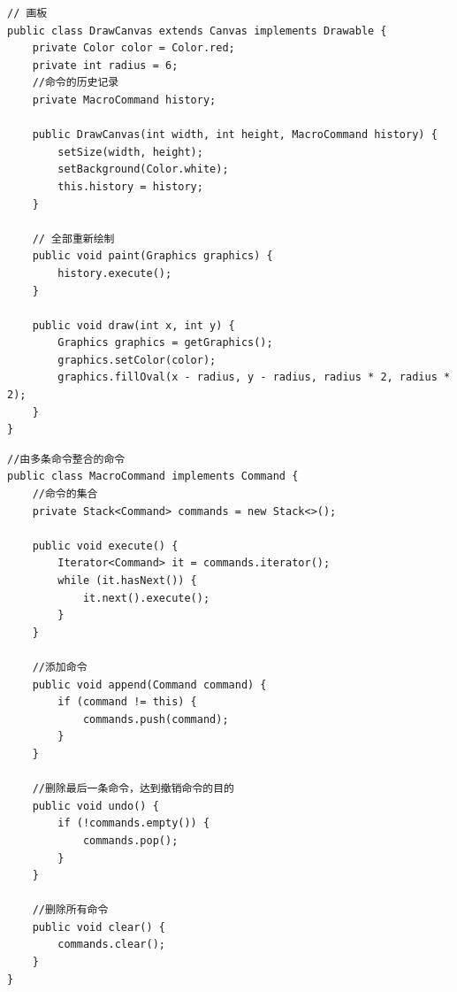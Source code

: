 \begin{lstlisting}
// 画板
public class DrawCanvas extends Canvas implements Drawable {
	private Color color = Color.red;
	private int radius = 6;
	//命令的历史记录
	private MacroCommand history;
	
	public DrawCanvas(int width, int height, MacroCommand history) {
		setSize(width, height);
		setBackground(Color.white);
		this.history = history;
	}
	
	// 全部重新绘制
	public void paint(Graphics graphics) {
		history.execute();
	}
	
	public void draw(int x, int y) {
		Graphics graphics = getGraphics();
		graphics.setColor(color);
		graphics.fillOval(x - radius, y - radius, radius * 2, radius * 2);
	}
}
\end{lstlisting}
\begin{lstlisting}
//由多条命令整合的命令
public class MacroCommand implements Command {
	//命令的集合
	private Stack<Command> commands = new Stack<>();
	
	public void execute() {
		Iterator<Command> it = commands.iterator();
		while (it.hasNext()) {
			it.next().execute();
		}
	}
	
	//添加命令
	public void append(Command command) {
		if (command != this) {
			commands.push(command);
		}
	}
	
	//删除最后一条命令，达到撤销命令的目的
	public void undo() {
		if (!commands.empty()) {
			commands.pop();
		}
	}
	
	//删除所有命令
	public void clear() {
		commands.clear();
	}
}
\end{lstlisting}
